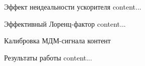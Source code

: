 \documentclass[14pt]{beamer}
\begin{document}
\begin{frame}{Эффект неидеальности ускорителя}
	content...
\end{frame}

\begin{frame}{Эффективный Лоренц-фактор}
	content...
\end{frame}

\begin{frame}{Калибровка МДМ-сигнала}
контент
\end{frame}

\begin{frame}{Результаты работы}
	content...
\end{frame}

\end{document}
